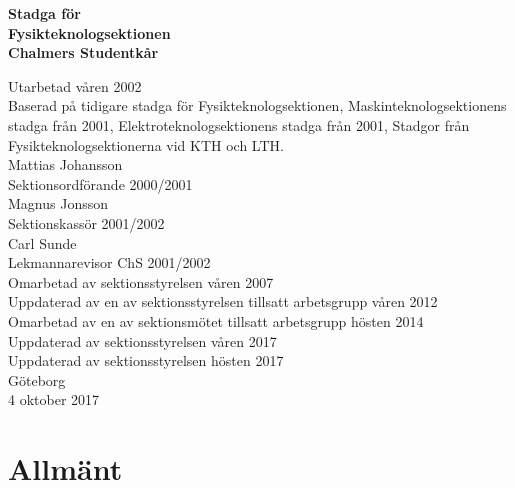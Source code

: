 \documentclass[11pt,a4paper]{article}
\begin{document}

\setlength{\headheight}{14pt}

  \begin{center}
    \textbf{\Huge{Stadga för}}\\[3mm]
    \textbf{\Huge{Fysikteknologsektionen}}\\
    \vspace{.7 cm}
    \textbf{\Large{Chalmers Studentkår}}


    \vfill

    Utarbetad våren 2002\\[5mm]
    Baserad på tidigare stadga för Fysikteknologsektionen,
    Maskinteknologsektionens stadga från 2001, Elektroteknologsektionens
    stadga från 2001, Stadgor från Fysikteknologsektionerna vid KTH och
LTH.\\[5mm]
    Mattias Johansson\\
    Sektionsordförande 2000/2001\\[5mm]
    Magnus Jonsson\\
    Sektionskassör 2001/2002\\[5mm]
    Carl Sunde\\
    Lekmannarevisor ChS 2001/2002\\[5mm]
    Omarbetad av sektionsstyrelsen våren 2007\\[5mm]
    Uppdaterad av en av sektionsstyrelsen tillsatt arbetsgrupp våren 2012\\[5mm]
    Omarbetad av en av sektionsmötet tillsatt arbetsgrupp hösten 2014\\[5mm]
    Uppdaterad av sektionsstyrelsen våren 2017\\
    Uppdaterad av sektionsstyrelsen hösten 2017\\
    \vspace{.3 cm}
    \small{Göteborg}\\
    \small{4 oktober 2017}
  \end{center}

\clearpage


\tableofcontents

\clearpage



\section{Allmänt}
\end{document}
